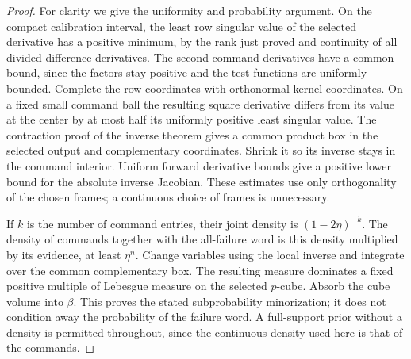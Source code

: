 \documentclass[11pt]{amsart}
\theoremstyle{definition}\newtheorem{definition}[theorem]{Definition}
\theoremstyle{remark}\newtheorem{remark}[theorem]{Remark}
\begin{document}
\begin{proof}
For clarity we give the uniformity and probability argument. On the
compact calibration interval, the least row singular value of the
selected derivative has a positive minimum, by the rank just proved
and continuity of all divided-difference derivatives. The second command
derivatives have a common bound, since the factors stay positive and
the test functions are uniformly bounded. Complete the row coordinates
with orthonormal kernel coordinates. On a fixed small command ball the
resulting square derivative differs from its value at the center by at
most half its uniformly positive least singular value. The contraction
proof of the inverse theorem gives a common product box in the selected
output and complementary coordinates. Shrink it so its inverse stays
in the command interior. Uniform forward derivative bounds give a
positive lower bound for the absolute inverse Jacobian. These estimates
use only orthogonality of the chosen frames; a continuous choice of
frames is unnecessary.

If $k$ is the number of command entries, their joint density is
$(1-2\eta)^{-k}$. The density of commands together with the all-failure
word is this density multiplied by its evidence, at least $\eta^n$.
Change variables using the local inverse and integrate over the common
complementary box. The resulting measure dominates a fixed positive
multiple of Lebesgue measure on the selected $p$-cube. Absorb the cube
volume into $\beta$. This proves the stated subprobability minorization;
it does not condition away the probability of the failure word. A
full-support prior without a density is permitted throughout, since the
continuous density used here is that of the commands.
\end{proof}
\end{document}
